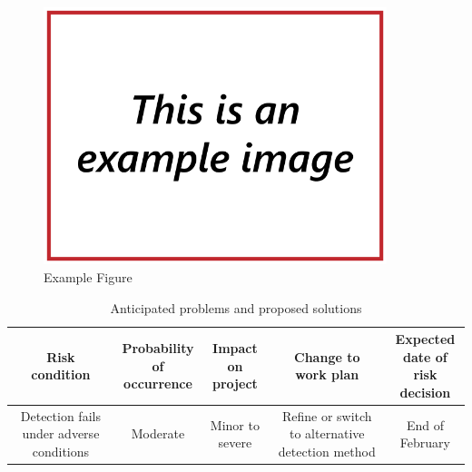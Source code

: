\begin{figure}
\includegraphics[width=100mm,natwidth=640,natheight=480]{"./image/Example"}
\caption{\label{fig:example}Example Figure}
\end{figure}



\begin{table}
\caption{\label{tab:contingency}Anticipated problems and proposed solutions}
\begin{tabular}{c|c|c|c|c}

\parbox[t]{2cm}{Risk\\condition} & \parbox[t]{2.5cm}{Probability\\of occurrence} & \parbox[t]{3cm}{Impact on\\project} & \parbox[t]{3cm}{Change to\\work plan} & \parbox[t]{2.4cm}{Expected\\date of risk\\decision}\\[1.6cm]
\hline

\parbox[t]{2cm}{Detection fails under adverse conditions}&
\parbox[t]{2.5cm}{Moderate}&
\parbox[t]{3cm}{Minor to severe}&
\parbox[t]{3cm}{Refine or switch to alternative detection method}&
\parbox[t]{2.4cm}{End of February}\\

\end{tabular}
\end{table}
